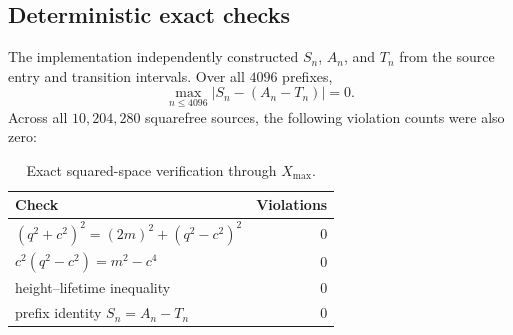 \subsection{Deterministic exact checks}

The implementation independently constructed $S_n$, $A_n$, and $T_n$ from the source entry and transition intervals.  Over all $4096$ prefixes,
\begin{equation}
 \max_{n\le4096}|S_n-(A_n-T_n)|=0.
 \label{eq:exact-AT-numerical}
\end{equation}
Across all $10{,}204{,}280$ squarefree sources, the following violation counts were also zero:

\begin{table}[htbp]
\centering
\caption{Exact squared-space verification through $X_{\max}$.}
\label{tab:exact-checks}
\small
\begin{tabular}{lr}
\toprule
Check & Violations\\
\midrule
$(q^2+c^2)^2=(2m)^2+(q^2-c^2)^2$ & 0\\
$c^2(q^2-c^2)=m^2-c^4$ & 0\\
height--lifetime inequality & 0\\
prefix identity $S_n=A_n-T_n$ & 0\\
\bottomrule
\end{tabular}
\end{table}


